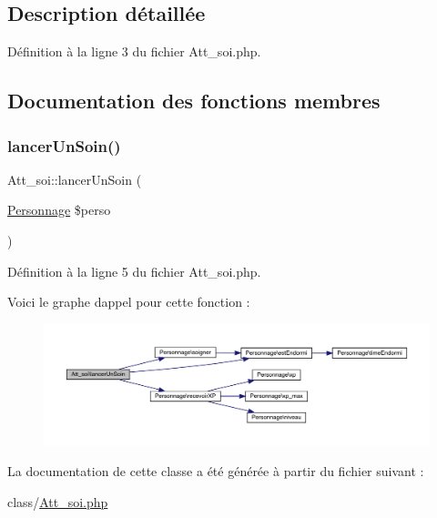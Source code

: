 \subsection{Description détaillée}


Définition à la ligne 3 du fichier Att\+\_\+soi.\+php.



\subsection{Documentation des fonctions membres}
\mbox{\label{class_att__soi_a7da2d15a0bedd2880e7491f72b430bf0}} 
\subsubsection{\texorpdfstring{lancer\+Un\+Soin()}{lancerUnSoin()}}
{\footnotesize\ttfamily Att\+\_\+soi\+::lancer\+Un\+Soin (\begin{DoxyParamCaption}\item[{\mbox{\hyperlink{class_personnage}{Personnage}}}]{\$perso }\end{DoxyParamCaption})}



Définition à la ligne 5 du fichier Att\+\_\+soi.\+php.

Voici le graphe d\textquotesingle{}appel pour cette fonction \+:\nopagebreak
\begin{figure}[H]
\begin{center}
\leavevmode
\includegraphics[width=350pt]{class_att__soi_a7da2d15a0bedd2880e7491f72b430bf0_cgraph}
\end{center}
\end{figure}


La documentation de cette classe a été générée à partir du fichier suivant \+:\begin{DoxyCompactItemize}
\item 
class/\mbox{\hyperlink{_att__soi_8php}{Att\+\_\+soi.\+php}}\end{DoxyCompactItemize}
